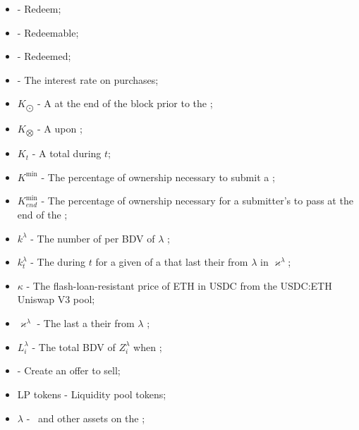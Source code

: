 \documentclass[class=article, crop=false]{standalone}
\begin{document}
\begin{itemize}[topsep=0pt, itemsep=3pt,leftmargin=16pt]
    \item[]  - \hypertarget{ht112}{Redeem};
    \item[]  - \hypertarget{ht113}{Redeemable};
    \item[]  - \hypertarget{ht114}{Redeemed};
    \item[]  - \hypertarget{ht115}{The interest rate on  purchases};
    \item[] $K_{\bigodot}$ - \hypertarget{ht116}{A   at the end of the block prior to the };
    \item[] $K_{\bigotimes}$ - \hypertarget{ht117}{A   upon };
    \item[] $K_t$ - \hypertarget{ht118}{A  total  during $t$};
    \item[] $K^{\text{min}}$ - \hypertarget{ht119}{The percentage of  ownership necessary to submit a };
    \item[] $K_{end}^{\text{min}}$ - The percentage of  ownership necessary for a submitter's  to pass at the end of the ;
    \item[] $k^{\lambda}$ - \hypertarget{ht120}{The number of  per BDV of $\lambda$ };
    \item[] $k_{t}^{\lambda}$ - \hypertarget{ht121}{The  during $t$ for a given  of a  that last  their  from \hyperlink{ht126}{$\lambda$}  in $\varkappa^{\lambda}$};
    \item[] $\kappa$ - The flash-loan-resistant price of ETH in USDC from the USDC:ETH Uniswap V3 pool;
    \item[] $\varkappa^{\lambda}$ - \hypertarget{ht122}{The last  a   their  from \hyperlink{ht126}{$\lambda$} };
    \item[] $L_i^{\lambda}$ - \hypertarget{ht123}{The total BDV of $Z_i^{\lambda}$ when };
    \item[]  - \hypertarget{ht124}{Create an offer to sell};
    \item[] LP tokens - \hypertarget{ht125}{Liquidity pool tokens};
    \item[] $\lambda$ - \hypertarget{ht126}{\Bean\ and other assets on the };

\end{itemize}
\end{document}
